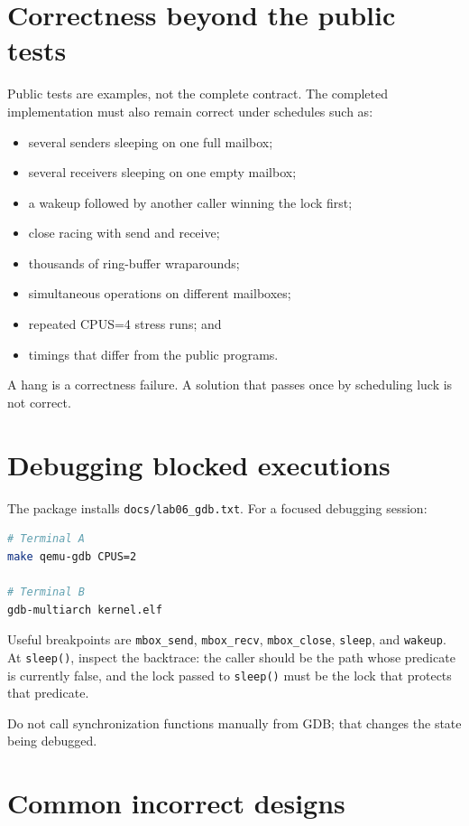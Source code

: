 \documentclass[11pt,a4paper]{article}
\newcommand{\file}[1]{\texttt{#1}}
\begin{document}
\section{Correctness beyond the public tests}

Public tests are examples, not the complete contract. The completed implementation must also remain correct under schedules such as:

\begin{itemize}[leftmargin=7mm]
\item several senders sleeping on one full mailbox;
\item several receivers sleeping on one empty mailbox;
\item a wakeup followed by another caller winning the lock first;
\item close racing with send and receive;
\item thousands of ring-buffer wraparounds;
\item simultaneous operations on different mailboxes;
\item repeated CPUS=4 stress runs; and
\item timings that differ from the public programs.
\end{itemize}

A hang is a correctness failure. A solution that passes once by scheduling luck is not correct.

\section{Debugging blocked executions}

The package installs \file{docs/lab06\_gdb.txt}. For a focused debugging session:

\begin{lstlisting}[language=bash]
# Terminal A
make qemu-gdb CPUS=2

# Terminal B
gdb-multiarch kernel.elf
\end{lstlisting}

Useful breakpoints are \file{mbox\_send}, \file{mbox\_recv}, \file{mbox\_close}, \file{sleep}, and \file{wakeup}. At \file{sleep()}, inspect the backtrace: the caller should be the path whose predicate is currently false, and the lock passed to \file{sleep()} must be the lock that protects that predicate.

Do not call synchronization functions manually from GDB; that changes the state being debugged.

\section{Common incorrect designs}
\end{document}

